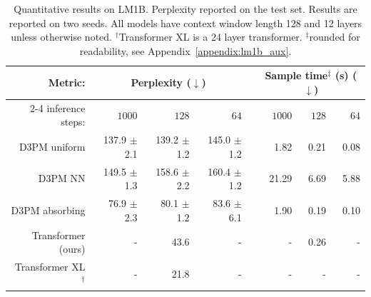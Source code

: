 \begin{table}[t] %
\vspace{-0.3cm}
  \caption{Quantitative results on LM1B. Perplexity reported on the test set. Results are reported on two seeds. All models have context window length 128 and 12 layers unless otherwise noted. $^\dagger$Transformer XL is a 24 layer transformer. $^\ddagger$rounded for readability, see Appendix~\ref{appendix:lm1b_aux}.}
  \label{tab:lm1b}
  \scriptsize
  \centering
  \begin{tabular}{r rrr c rrr}
    \toprule
    Metric: &\multicolumn{3}{c}{Perplexity ($\downarrow$)}
    &&\multicolumn{3}{c}{Sample time$^\ddagger$ (s) ($\downarrow$)}\\
    \cmidrule{2-4}\cmidrule{6-8}
    inference steps: & $1000$
    & $128$
    & $64$
    &
    & $1000$
    & $128$
    & $64$\\
    \midrule
    D3PM uniform
    & 137.9 $\pm$ 2.1 & 139.2 $\pm$ 1.2 & 145.0 $\pm$ 1.2 &
    & 1.82 & 0.21 & 0.08 \\
    D3PM NN
    & 149.5 $\pm$ 1.3 & 158.6 $\pm$ 2.2 & 160.4 $\pm$ 1.2 &
    & 21.29 & 6.69 & 5.88 \\
    D3PM absorbing
    & 76.9 $\pm$ 2.3 & 80.1 $\pm$ 1.2 & 83.6 $\pm$ 6.1 &
    & 1.90 & 0.19 & 0.10 \\
    \midrule
    Transformer (ours)
    & - & 43.6 & - &
    & - & 0.26 & -\\
    Transformer XL \citep{transformer_xl}$^\dagger$
    & - & 21.8 & - &
    & - & - & -\\
    \bottomrule
  \end{tabular}
\end{table}

